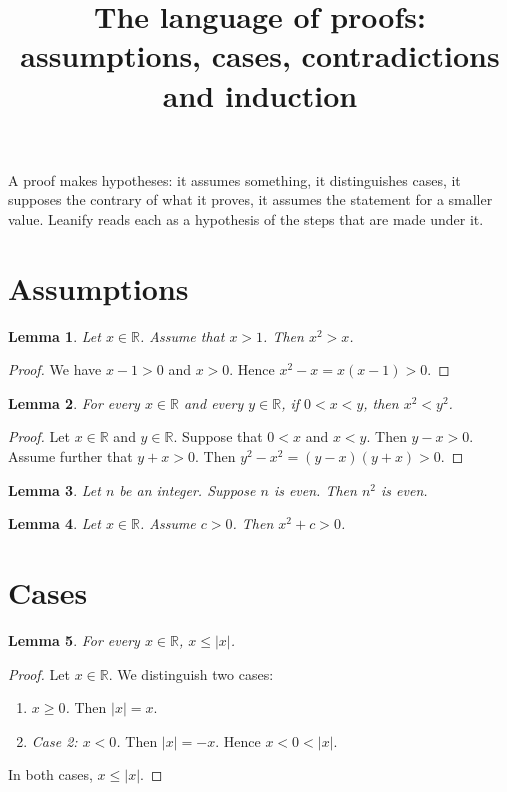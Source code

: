\documentclass{article}
\title{The language of proofs: assumptions, cases, contradictions and induction}
\newtheorem{lemma}{Lemma}
\begin{document}
\maketitle

A proof makes hypotheses: it assumes something, it distinguishes cases, it supposes the contrary of what it proves, it assumes the statement for a smaller value.
Leanify reads each as a hypothesis of the steps that are made under it.

\section{Assumptions}

\begin{lemma}\label{lem:assume}
Let $x\in\mathbb{R}$.
Assume that $x>1$.
Then $x^2>x$.
\end{lemma}

\begin{proof}
We have $x-1>0$ and $x>0$.
Hence $x^2-x=x(x-1)>0$.
\end{proof}

\begin{lemma}\label{lem:further}
For every $x\in\mathbb{R}$ and every $y\in\mathbb{R}$, if $0<x<y$, then $x^2<y^2$.
\end{lemma}

\begin{proof}
Let $x\in\mathbb{R}$ and $y\in\mathbb{R}$.
Suppose that $0<x$ and $x<y$.
Then $y-x>0$.
Assume further that $y+x>0$.
Then $y^2-x^2=(y-x)(y+x)>0$.
\end{proof}

\begin{lemma}\label{lem:parity}
Let $n$ be an integer.
Suppose $n$ is even.
Then $n^2$ is even.
\end{lemma}

\begin{lemma}\label{lem:new-variable}
Let $x\in\mathbb{R}$.
Assume $c>0$.
Then $x^2+c>0$.
\end{lemma}

\section{Cases}

\begin{lemma}\label{lem:abs}
For every $x\in\mathbb{R}$, $x\le\lvert x\rvert$.
\end{lemma}

\begin{proof}
Let $x\in\mathbb{R}$.
We distinguish two cases:
\begin{enumerate}
\item \emph{$x\ge0$.} Then $\lvert x\rvert=x$.
\item \emph{Case 2: $x<0$.} Then $\lvert x\rvert=-x$.
Hence $x<0<\lvert x\rvert$.
\end{enumerate}
In both cases, $x\le\lvert x\rvert$.
\end{proof}
\end{document}
